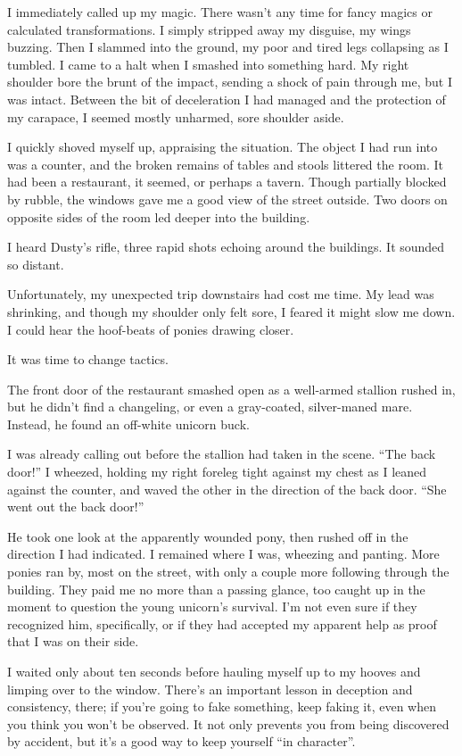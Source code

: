 I immediately called up my magic. There wasn’t any time for fancy magics or calculated transformations. I simply stripped away my disguise, my wings buzzing. Then I slammed into the ground, my poor and tired legs collapsing as I tumbled. I came to a halt when I smashed into something hard. My right shoulder bore the brunt of the impact, sending a shock of pain through me, but I was intact. Between the bit of deceleration I had managed and the protection of my carapace, I seemed mostly unharmed, sore shoulder aside.

I quickly shoved myself up, appraising the situation. The object I had run into was a counter, and the broken remains of tables and stools littered the room. It had been a restaurant, it seemed, or perhaps a tavern. Though partially blocked by rubble, the windows gave me a good view of the street outside. Two doors on opposite sides of the room led deeper into the building.

I heard Dusty’s rifle, three rapid shots echoing around the buildings. It sounded so distant.

Unfortunately, my unexpected trip downstairs had cost me time. My lead was shrinking, and though my shoulder only felt sore, I feared it might slow me down. I could hear the hoof-beats of ponies drawing closer.

It was time to change tactics.

The front door of the restaurant smashed open as a well-armed stallion rushed in, but he didn’t find a changeling, or even a gray-coated, silver-maned mare. Instead, he found an off-white unicorn buck.

I was already calling out before the stallion had taken in the scene. “The back door!” I wheezed, holding my right foreleg tight against my chest as I leaned against the counter, and waved the other in the direction of the back door. “She went out the back door!”

He took one look at the apparently wounded pony, then rushed off in the direction I had indicated. I remained where I was, wheezing and panting. More ponies ran by, most on the street, with only a couple more following through the building. They paid me no more than a passing glance, too caught up in the moment to question the young unicorn’s survival. I’m not even sure if they recognized him, specifically, or if they had accepted my apparent help as proof that I was on their side.

I waited only about ten seconds before hauling myself up to my hooves and limping over to the window. There’s an important lesson in deception and consistency, there; if you’re going to fake something, keep faking it, even when you think you won’t be observed. It not only prevents you from being discovered by accident, but it’s a good way to keep yourself “in character”.

